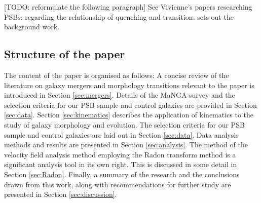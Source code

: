 [TODO: reformulate the following paragraph] See Vivienne's  papers researching PSBs: \citet{2017MNRAS.472.1401A} regarding the relationship of quenching and transition. \citet{2016MNRAS.463..832W} sets out the background work.


\subsection{Structure of the paper}
The content of the paper is organised as follows: A concise review of the literature on galaxy mergers and morphology transitions relevant to the paper is introduced in Section \ref{sec:mergers}. Details of the MaNGA survey and the selection criteria for our PSB sample and control galaxies are provided in Section \ref{sec:data}. Section \ref{sec:kinematics} describes the application of kinematics to the study of galaxy morphology and evolution. The selection criteria for our PSB sample and control galaxies are laid out in Section \ref{sec:data}. Data analysis methods and results are presented in Section \ref{sec:analysis}. The method of the velocity field analysis method employing the Radon transform method is a significant analysis tool in its own right. This is discussed in some detail in Section \ref{sec:Radon}. Finally, a summary of the research and the conclusions drawn from this work, along with recommendations for further study are presented in Section \ref{sec:discussion}.
